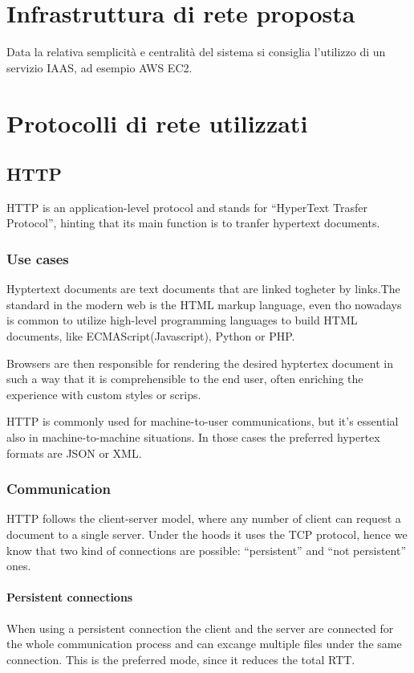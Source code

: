 \section{Infrastruttura di rete proposta}

Data la relativa semplicità e centralità del sistema si consiglia l'utilizzo di un servizio IAAS, ad esempio AWS EC2.

\section{Protocolli di rete utilizzati}

\subsection{HTTP}

HTTP is an application-level protocol and stands for ``HyperText Trasfer Protocol'', hinting that its main function is to tranfer hypertext documents.

\subsubsection{Use cases}

Hyptertext documents are text documents that are linked togheter by links.The standard in the modern web is the HTML markup language, even tho nowadays is common to utilize high-level programming languages to build HTML documents, like ECMAScript(Javascript), Python or PHP.

Browsers are then responsible for rendering the desired hyptertex document in such a way that it is comprehensible to the end user, often enriching the experience with custom styles or scrips.

HTTP is commonly used for machine-to-user communications, but it's essential also in machine-to-machine situations. In those cases the preferred hypertex formats are JSON or XML.

\subsubsection{Communication}

HTTP follows the client-server model, where any number of client can request a document to a single server. Under the hoods it uses the TCP protocol, hence we know that two kind of connections are possible: ``persistent'' and ``not persistent'' ones.

\paragraph{Persistent connections}
When using a persistent connection the client and the server are connected for the whole communication process and can excange multiple files under the same connection. This is the preferred mode, since it reduces the total RTT.

